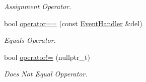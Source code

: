 \begin{DoxyCompactItemize}
\begin{DoxyCompactList}\small\item\em Assignment Operator. \end{DoxyCompactList}\item 
\hypertarget{class_event_handler_a5a967210bc6305b30907418a92ce33bd}{bool \hyperlink{class_event_handler_a5a967210bc6305b30907418a92ce33bd}{operator==} (const \hyperlink{class_event_handler}{Event\+Handler} \&del)}\label{class_event_handler_a5a967210bc6305b30907418a92ce33bd}

\begin{DoxyCompactList}\small\item\em Equals Operator. \end{DoxyCompactList}\item 
\hypertarget{class_event_handler_a1f294dfbcd25a69b680e8647e7939c52}{bool \hyperlink{class_event_handler_a1f294dfbcd25a69b680e8647e7939c52}{operator!=} (nullptr\+\_\+t)}\label{class_event_handler_a1f294dfbcd25a69b680e8647e7939c52}

\begin{DoxyCompactList}\small\item\em Does Not Equal Opperator. \end{DoxyCompactList}\end{DoxyCompactItemize}
